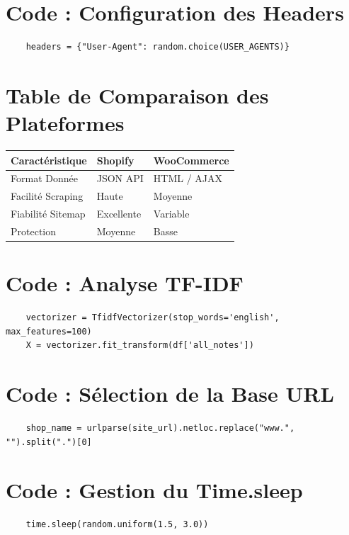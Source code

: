 \documentclass[11pt,a4paper,oneside]{report}
\begin{document}
    \section{Code : Configuration des Headers}
    \begin{lstlisting}
    headers = {"User-Agent": random.choice(USER_AGENTS)}
    \end{lstlisting}

    \section{Table de Comparaison des Plateformes}
    \begin{longtable}{lll}
    \toprule
    Caractéristique & Shopify & WooCommerce \\
    \midrule
    Format Donnée & JSON API & HTML / AJAX \\
    Facilité Scraping & Haute & Moyenne \\
    Fiabilité Sitemap & Excellente & Variable \\
    Protection & Moyenne & Basse \\
    \bottomrule
    \end{longtable}

    \section{Code : Analyse TF-IDF}
    \begin{lstlisting}
    vectorizer = TfidfVectorizer(stop_words='english', max_features=100)
    X = vectorizer.fit_transform(df['all_notes'])
    \end{lstlisting}

    \section{Code : Sélection de la Base URL}
    \begin{lstlisting}
    shop_name = urlparse(site_url).netloc.replace("www.", "").split(".")[0]
    \end{lstlisting}

    \section{Code : Gestion du Time.sleep}
    \begin{lstlisting}
    time.sleep(random.uniform(1.5, 3.0))
    \end{lstlisting}
\end{document}
